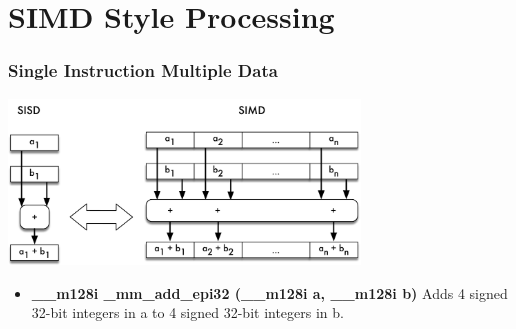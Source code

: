 \documentclass{beamer}
\begin{document}
\section{SIMD Style Processing}
\begin{frame}
\frametitle{Single Instruction Multiple Data}
\begin{center}
\includegraphics[width=0.7\textwidth]{img/simd.pdf}
\end{center}
\begin{itemize}[label=\textbullet,leftmargin=1em]
\item \textbf{\_\_m128i \_mm\_add\_epi32 (\_\_m128i a, \_\_m128i b)} Adds  4 signed 32-bit integers in a to 4 signed 32-bit integers
in b.
\end{itemize}
\end{frame}
\end{document}
